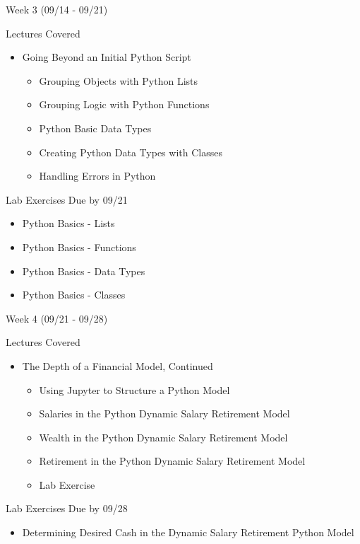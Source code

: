 \documentclass[]{article}
\begin{document}
\begin{section}{Week 3 (09/14 - 09/21)}
\begin{subsection}{Lectures Covered}
\begin{itemize}
\item Going Beyond an Initial Python Script
\begin{itemize}
\item Grouping Objects with Python Lists
\item Grouping Logic with Python Functions
\item Python Basic Data Types
\item Creating Python Data Types with Classes
\item Handling Errors in Python
\end{itemize}
\end{itemize}
\end{subsection}
\begin{subsection}{Lab Exercises Due by 09/21}
\begin{itemize}
\item Python Basics - Lists
\item Python Basics - Functions
\item Python Basics - Data Types
\item Python Basics - Classes
\end{itemize}
\end{subsection}
\end{section}
\begin{section}{Week 4 (09/21 - 09/28)}
\begin{subsection}{Lectures Covered}
\begin{itemize}
\item The Depth of a Financial Model, Continued
\begin{itemize}
\item Using Jupyter to Structure a Python Model
\item Salaries in the Python Dynamic Salary Retirement Model
\item Wealth in the Python Dynamic Salary Retirement Model
\item Retirement in the Python Dynamic Salary Retirement Model
\item Lab Exercise
\end{itemize}
\end{itemize}
\end{subsection}
\begin{subsection}{Lab Exercises Due by 09/28}
\begin{itemize}
\item Determining Desired Cash in the Dynamic Salary Retirement Python Model
\end{itemize}
\end{subsection}
\end{section}
\end{document}
